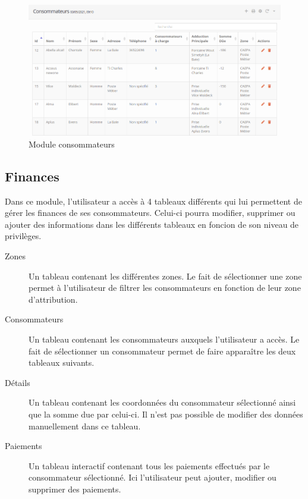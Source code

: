 \documentclass{EPL-master-thesis-covers-FR}
\begin{document}
				\begin{figure}[H]
					\centering
					\includegraphics[width=1\textwidth]{images/consumer_tab1}
					\caption{Module consommateurs}
				\end{figure}
			
\newpage
			\subsection{Finances}
				Dans ce module, l'utilisateur a accès à 4 tableaux différents qui lui permettent de gérer les finances de ses consommateurs. Celui-ci pourra modifier, supprimer ou ajouter des informations dans les différents tableaux en foncion de son niveau de privilèges.
				\begin{description}
					\item[Zones] Un tableau contenant les différentes zones. Le fait de sélectionner une zone permet à l'utilisateur de filtrer les consommateurs en fonction de leur zone d'attribution.
					\item[Consommateurs] Un tableau contenant les consommateurs auxquels l'utilisateur a accès. Le fait de sélectionner un consommateur permet de faire apparaître les deux tableaux suivants.
					\item[Détails] Un tableau contenant les coordonnées du consommateur sélectionné ainsi que la somme due par celui-ci. Il n'est pas possible de modifier des données manuellement dans ce tableau.
					\item[Paiements] Un tableau interactif contenant tous les paiements effectués par le consommateur sélectionné. Ici l'utilisateur peut ajouter, modifier ou supprimer des paiements.
				\end{description}
				
\end{document}
